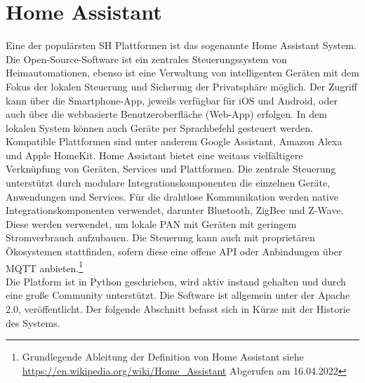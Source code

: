 \section{Home Assistant}
\label{sec:homeassistant}
    Eine der populärsten \acl{SH} Plattformen ist das sogenannte Home Assistant System. Die Open-Source-Software ist ein zentrales 
    Steuerungssystem von Heimautomationen, ebenso ist eine Verwaltung von intelligenten Geräten mit dem Fokus der lokalen Steuerung und Sicherung der 
    Privatsphäre möglich. Der Zugriff kann über die Smartphone-App, jeweils verfügbar für iOS und Android, oder auch über die webbasierte 
    Benutzeroberfläche (Web-App) erfolgen. In dem lokalen System können auch Geräte per Sprachbefehl gesteuert werden. Kompatible 
    Plattformen sind unter anderem Google Assistant, Amazon Alexa und Apple HomeKit. %
    Home Assistant bietet eine weitaus vielfältigere Verknüpfung von Geräten, Services und Plattformen. Die zentrale Steuerung 
    unterstützt durch modulare Integrationskomponenten die einzelnen Geräte, Anwendungen und Services. Für die drahtlose Kommunikation 
    werden native Integrationskomponenten verwendet, darunter Bluetooth, ZigBee und Z-Wave. Diese werden verwendet, um lokale \ac{PAN} mit 
    Geräten mit geringem Stromverbrauch aufzubauen. Die Steuerung kann auch mit proprietären Ökosystemen stattfinden, sofern diese eine offene 
    \acs{API} oder Anbindungen über \acs{MQTT} anbieten.\footnote{Grundlegende Ableitung der Definition von Home Assistant siehe \url{https://en.wikipedia.org/wiki/Home_Assistant} Abgerufen am 16.04.2022}
    \\
    Die Platform ist in Python geschrieben, wird aktiv instand gehalten und durch eine große Community unterstützt. Die Software ist allgemein unter 
    der Apache 2.0, veröffentlicht. Der folgende Abschnitt befasst sich in Kürze mit der Historie des Systems. 
    
